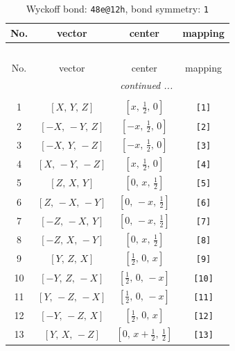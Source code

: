 \documentclass[fleqn,8pt]{jsarticle}
\begin{document}
\begin{longtable}{cccc}
\caption{Wyckoff bond: {\tt 48e@12h}, bond symmetry: {\tt 1}}
 \\
 \hline \hline
No. & vector & center & mapping \\ \hline \endfirsthead

\multicolumn{3}{l}{\tablename\ \thetable{}} \\
 \hline \hline
No. & vector & center & mapping \\ \hline \endhead

 \hline \hline
\multicolumn{3}{r}{\footnotesize\it continued ...} \\ \endfoot

 \hline \hline
\multicolumn{3}{r}{} \\ \endlastfoot

1 & $\left[ X,\, Y,\, Z \right]$ & $\left[ x,\, \frac{1}{2},\, 0 \right]$ & {\tt [1]} \\ \hline
2 & $\left[ - X,\, - Y,\, Z \right]$ & $\left[ - x,\, \frac{1}{2},\, 0 \right]$ & {\tt [2]} \\ \hline
3 & $\left[ - X,\, Y,\, - Z \right]$ & $\left[ - x,\, \frac{1}{2},\, 0 \right]$ & {\tt [3]} \\ \hline
4 & $\left[ X,\, - Y,\, - Z \right]$ & $\left[ x,\, \frac{1}{2},\, 0 \right]$ & {\tt [4]} \\ \hline
5 & $\left[ Z,\, X,\, Y \right]$ & $\left[ 0,\, x,\, \frac{1}{2} \right]$ & {\tt [5]} \\ \hline
6 & $\left[ Z,\, - X,\, - Y \right]$ & $\left[ 0,\, - x,\, \frac{1}{2} \right]$ & {\tt [6]} \\ \hline
7 & $\left[ - Z,\, - X,\, Y \right]$ & $\left[ 0,\, - x,\, \frac{1}{2} \right]$ & {\tt [7]} \\ \hline
8 & $\left[ - Z,\, X,\, - Y \right]$ & $\left[ 0,\, x,\, \frac{1}{2} \right]$ & {\tt [8]} \\ \hline
9 & $\left[ Y,\, Z,\, X \right]$ & $\left[ \frac{1}{2},\, 0,\, x \right]$ & {\tt [9]} \\ \hline
10 & $\left[ - Y,\, Z,\, - X \right]$ & $\left[ \frac{1}{2},\, 0,\, - x \right]$ & {\tt [10]} \\ \hline
11 & $\left[ Y,\, - Z,\, - X \right]$ & $\left[ \frac{1}{2},\, 0,\, - x \right]$ & {\tt [11]} \\ \hline
12 & $\left[ - Y,\, - Z,\, X \right]$ & $\left[ \frac{1}{2},\, 0,\, x \right]$ & {\tt [12]} \\ \hline
13 & $\left[ Y,\, X,\, - Z \right]$ & $\left[ 0,\, x + \frac{1}{2},\, \frac{1}{2} \right]$ & {\tt [13]} \\ \hline

\end{longtable}
\end{document}
